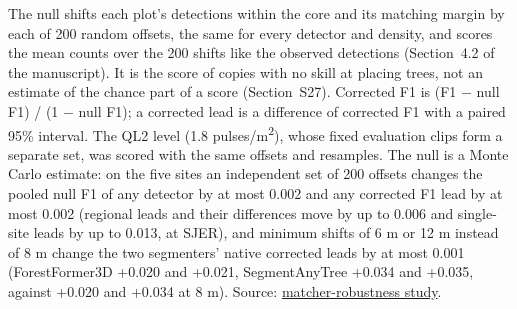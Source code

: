 \documentclass[10pt,a4paper]{article}
\begin{document}
The null shifts each plot's detections within the core and its matching margin
by each of 200 random offsets, the same for every detector and density, and
scores the mean counts over the 200 shifts like the observed detections (Section~4.2 of the manuscript). It is the score of copies with no skill at placing
trees, not an estimate of the chance part of a score (Section~S27). Corrected F1
is (F1 $-$ null F1) / (1 $-$ null F1); a corrected lead is a difference of corrected
F1 with a paired 95\% interval. The QL2 level (1.8 pulses/m\textsuperscript{2}), whose fixed
evaluation clips form a separate set, was scored with the same offsets and
resamples. The null is a Monte Carlo estimate: on the five sites an independent
set of 200 offsets changes the pooled null F1 of any detector by at most 0.002
and any corrected F1 lead by at most 0.002 (regional leads and their differences
move by up to 0.006 and single-site leads by up to 0.013, at SJER), and minimum
shifts of 6 m or 12 m instead of 8 m change the two segmenters' native corrected
leads by at most 0.001 (ForestFormer3D +0.020 and +0.021, SegmentAnyTree +0.034
and +0.035, against +0.020 and +0.034 at 8 m). Source: \href{https://github.com/devakellc/lidar-tree-benchmark/blob/main/results/matcher-robustness-results.md}{matcher-robustness
study}.
\end{document}
